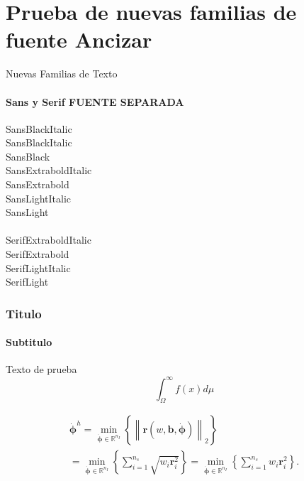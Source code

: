 \documentclass[]{beamer} %
\begin{document}
\section{Prueba de nuevas familias de fuente Ancizar}
\begin{frame}{Nuevas Familias de Texto}
	\framesubtitle{Sans y Serif FUENTE SEPARADA}
	
	
	{\SansBlackItalic     SansBlackItalic    } \\
	{\SansBlackItalic     SansBlackItalic    } \\
	{\SansBlack           SansBlack          } \\
	{\SansExtraboldItalic SansExtraboldItalic} \\
	{\SansExtrabold       SansExtrabold      } \\
	{\SansLightItalic     SansLightItalic    } \\
	{\SansLight           SansLight          } \\~\\
 	
 	{\SerifExtraboldItalic SerifExtraboldItalic} \\
 	{\SerifExtrabold       SerifExtrabold      } \\
 	{\SerifLightItalic     SerifLightItalic    } \\
 	{\SerifLight           SerifLight          } \\
 	
	
\end{frame}





\begin{frame}
	\frametitle{Titulo}
	\framesubtitle{Subtitulo} 
  
  Texto de prueba
  \begin{equation}
  	\int_{\Omega}^{\infty}f(x)d\mu
  \end{equation}

  \begin{multline}
  	\label{LeastSquares}
  	\dot{\mathbf{\phi}}^h=\min_{\dot{\mathbf{\phi}}\in\mathbb{R}^{n_{I}}} \left\lbrace \left\|\mathbf{r}(w,\mathbf{b},\dot{\mathbf{\phi}}) \right\|_2  \right\rbrace\\
  	=\min_{\dot{\mathbf{\phi}}\in\mathbb{R}^{n_{I}}} \left\lbrace \sum_{i=1}^{n_s} \sqrt{w_i\mathbf{r}_i^2}  \right\rbrace =\min_{\dot{\mathbf{\phi}}\in\mathbb{R}^{n_{I}}} \left\lbrace \sum_{i=1}^{n_s} {w_i\mathbf{r}_i^2}  \right\rbrace.
  \end{multline}

  
\end{frame}
	
\end{document}
